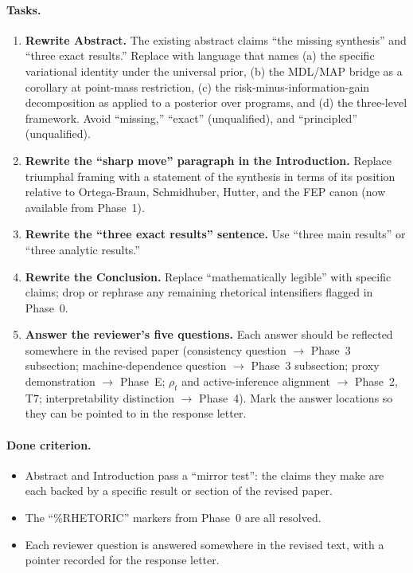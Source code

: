 \documentclass[11pt]{article}
\begin{document}
\paragraph{Tasks.}
\begin{enumerate}[leftmargin=*]
\item \textbf{Rewrite Abstract.} The existing abstract claims ``the missing synthesis'' and ``three exact results.'' Replace with language that names (a) the specific variational identity under the universal prior, (b) the MDL/MAP bridge as a corollary at point-mass restriction, (c) the risk-minus-information-gain decomposition as applied to a posterior over programs, and (d) the three-level framework. Avoid ``missing,'' ``exact'' (unqualified), and ``principled'' (unqualified).
\item \textbf{Rewrite the ``sharp move'' paragraph in the Introduction.} Replace triumphal framing with a statement of the synthesis in terms of its position relative to Ortega-Braun, Schmidhuber, Hutter, and the FEP canon (now available from Phase~1).
\item \textbf{Rewrite the ``three exact results'' sentence.} Use ``three main results'' or ``three analytic results.''
\item \textbf{Rewrite the Conclusion.} Replace ``mathematically legible'' with specific claims; drop or rephrase any remaining rhetorical intensifiers flagged in Phase~0.
\item \textbf{Answer the reviewer's five questions.} Each answer should be reflected somewhere in the revised paper (consistency question $\to$ Phase~3 subsection; machine-dependence question $\to$ Phase~3 subsection; proxy demonstration $\to$ Phase~E; $\rho_t$ and active-inference alignment $\to$ Phase~2, T7; interpretability distinction $\to$ Phase~4). Mark the answer locations so they can be pointed to in the response letter.
\end{enumerate}

\paragraph{Done criterion.}
\begin{itemize}[leftmargin=*]
\item Abstract and Introduction pass a ``mirror test'': the claims they make are each backed by a specific result or section of the revised paper.
\item The ``\%RHETORIC'' markers from Phase~0 are all resolved.
\item Each reviewer question is answered somewhere in the revised text, with a pointer recorded for the response letter.
\end{itemize}
\end{document}
